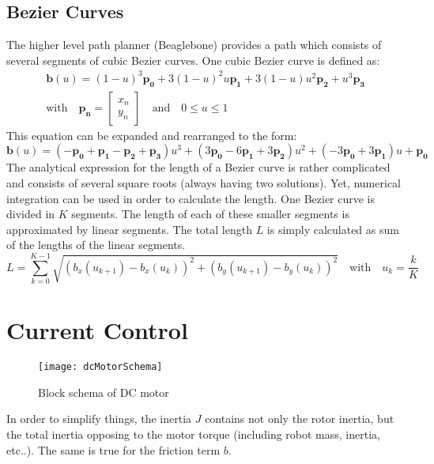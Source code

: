 \documentclass[a4paper, 11pt]{article}
\begin{document}
\subsection{Bezier Curves}
The higher level path planner (Beaglebone) provides a path which consists of several segments of cubic Bezier curves. One cubic Bezier curve is defined as: 
\begin{equation}
\begin{split}
	\mathbf{b}(u) = (1-u)^3\mathbf{p_0} + 3(1-u)^2u\mathbf{p_1} + 3(1-u)u^2\mathbf{p_2} +  u^3\mathbf{p_3}\\[8pt]
	\textrm{with} \quad 
	\mathbf{p_n} = 
	\begin{bmatrix}
	x_n\\ y_n
	\end{bmatrix} \quad \textrm{and} \quad
	0 \le u \le 1 
\end{split}
	\label{eq:bezier}
\end{equation}
This equation can be expanded and rearranged to the form:
\begin{equation}
	\mathbf{b}(u) = (-\mathbf{p_0} + \mathbf{p_1} - \mathbf{p_2} + \mathbf{p_3})u^3 + (3\mathbf{p_0} - 6\mathbf{p_1} + 3\mathbf{p_2})u^2 + (-3\mathbf{p_0} + 3\mathbf{p_1})u + \mathbf{p_0}
\end{equation}
The analytical expression for the length of a Bezier curve is rather complicated and consists of several square roots (always having two solutions). Yet, numerical integration can be used in order to calculate the length. One Bezier curve is divided in $K$ segments. The length of each of these smaller segments is approximated by linear segments. The total length $L$ is simply calculated as sum of the lengths of the linear segments. 
\begin{equation}
	L = \sum_{k = 0}^{K-1} \sqrt{  \left( b_x(u_{k+1}) - b_x(u_k) \right)^2  + \left(b_y(u_{k+1}) - b_y(u_k) \right)^2 } 
	\quad \textrm{with} \quad u_k = \frac{k}{K}
\end{equation}


\newpage
\section{Current Control}
\begin{figure}[H]
	\centering
	\texttt{[image: dcMotorSchema]}
	\caption{Block schema of DC motor}		
\end{figure}
In order to simplify things, the inertia $J$ contains not only the rotor inertia, but the total inertia opposing to the motor torque (including robot mass, inertia, etc..). The same is true for the friction term $b$. 
\end{document}
